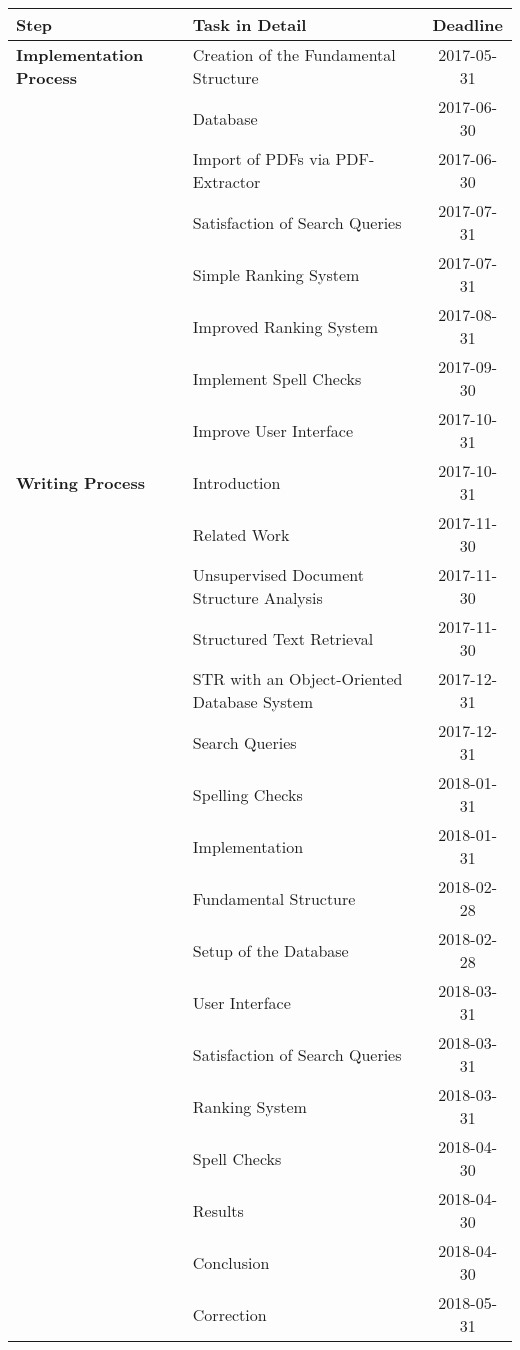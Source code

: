 \documentclass[a4paper, 12pt]{scrartcl}
\begin{document}
\begin{tabular}{ | l | l | c | }
  \hline
  \rowcolor{lightblue}
  \textbf{Step} & \textbf{Task in Detail} & \textbf{Deadline} \\ \hline
  \textbf{Implementation Process} & Creation of the Fundamental Structure & 2017-05-31 \\ \hline
    & Database & 2017-06-30 \\ \hline
    & Import of PDFs via PDF-Extractor & 2017-06-30 \\ \hline
    & Satisfaction of Search Queries & 2017-07-31 \\ \hline
    & Simple Ranking System & 2017-07-31 \\ \hline
    & Improved Ranking System & 2017-08-31 \\ \hline
    & Implement Spell Checks & 2017-09-30 \\ \hline
    & Improve User Interface & 2017-10-31 \\ \hline \hline
  \textbf{Writing Process} & Introduction & 2017-10-31 \\ \hline
    & Related Work & 2017-11-30 \\ \hline
    & Unsupervised Document Structure Analysis & 2017-11-30 \\ \hline
    & Structured Text Retrieval & 2017-11-30 \\ \hline
    & STR with an Object-Oriented Database System & 2017-12-31 \\ \hline
    & Search Queries & 2017-12-31 \\ \hline
    & Spelling Checks & 2018-01-31 \\ \hline
    & Implementation & 2018-01-31 \\ \hline
    & Fundamental Structure & 2018-02-28 \\ \hline
    & Setup of the Database & 2018-02-28 \\ \hline
    & User Interface & 2018-03-31 \\ \hline
    & Satisfaction of Search Queries & 2018-03-31 \\ \hline
    & Ranking System & 2018-03-31 \\ \hline
    & Spell Checks & 2018-04-30 \\ \hline
    & Results & 2018-04-30  \\ \hline
    & Conclusion & 2018-04-30 \\ \hline
    & Correction & 2018-05-31 \\ \hline
\end{tabular}
\end{document}
